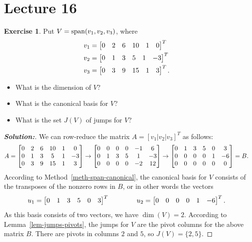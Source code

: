 \documentclass[a4paper]{amsart}
\theoremstyle{definition}
\newtheorem{exercise}{Exercise}
\newenvironment{solution}{\begin{proof}[\textbf{Solution:}] \vphantom{u}}{\end{proof}}
\begin{document}
\section{Lecture 16}

\begin{exercise}\label{ex-jumps-i}
 Put $V=\operatorname{span}(v_1,v_2,v_3)$, where
 \begin{align*}
  v_1 &= \left[\begin{matrix} 0&2&6&10&1&0 \end{matrix}\right]^T \\
  v_2 &= \left[\begin{matrix} 0&1&3&5&1&-3 \end{matrix}\right]^T \\
  v_3 &= \left[\begin{matrix} 0&3&9&15&1&3 \end{matrix}\right]^T.
 \end{align*}
 \begin{itemize}
  \item[(a)] What is the dimension of $V$?
  \item[(b)] What is the canonical basis for $V$?
  \item[(c)] What is the set $J(V)$ of jumps for $V$?
 \end{itemize}
\end{exercise}
\begin{solution}
 We can row-reduce the matrix $A=[v_1|v_2|v_3]^T$ as follows:
 \[ A =
    \left[\begin{matrix} 
     0&2&6&10&1&0 \\
     0&1&3&5&1&-3 \\
     0&3&9&15&1&3
    \end{matrix}\right]
    \to
    \left[\begin{matrix} 
     0&0&0&0&-1&6 \\
     0&1&3&5&1&-3 \\
     0&0&0&0&-2&12
    \end{matrix}\right]
    \to
    \left[\begin{matrix} 
     0&1&3&5&0& 3 \\
     0&0&0&0&1&-6 \\
     0&0&0&0&0&0
    \end{matrix}\right]
    = B.
 \]
 According to Method~\ref{meth-span-canonical}, the canonical basis
 for $V$ consists of the transposes of the nonzero rows in $B$, or in
 other words the vectors
 \[ u_1=\left[\begin{matrix} 0&1&3&5&0&3\end{matrix}\right]^T \hspace{4em}
    u_2=\left[\begin{matrix} 0&0&0&0&1&-6 \end{matrix}\right]^T.
 \]
 As this basis consists of two vectors, we have $\dim(V)=2$.
 According to Lemma~\ref{lem-jumps-pivots}, the jumps for $V$ are the
 pivot columns for the above matrix $B$.  There are pivots in columns
 $2$ and $5$, so $J(V)=\{2,5\}$.
\end{solution}
\end{document}
